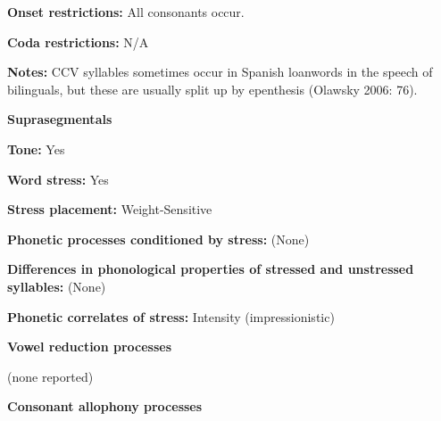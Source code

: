 \begin{styleBody}
\textbf{Onset restrictions: }All consonants occur.
\end{styleBody}

\begin{styleBody}
\textbf{Coda restrictions: }N/A
\end{styleBody}

\begin{styleBody}
\textbf{Notes: }CCV syllables sometimes occur in Spanish loanwords in the speech of bilinguals, but these are usually split up by epenthesis (Olawsky 2006: 76).
\end{styleBody}

\begin{styleBody}
\textbf{Suprasegmentals}
\end{styleBody}

\begin{styleBody}
\textbf{Tone:} Yes
\end{styleBody}

\begin{styleBody}
\textbf{Word stress: }Yes
\end{styleBody}

\begin{styleBody}
\textbf{Stress placement:} Weight-Sensitive
\end{styleBody}

\begin{styleBody}
\textbf{Phonetic processes conditioned by stress:} (None)
\end{styleBody}

\begin{styleBody}
\textbf{Differences in phonological properties of stressed and unstressed syllables:} (None)
\end{styleBody}

\begin{styleBody}
\textbf{Phonetic correlates of stress: }Intensity (impressionistic)
\end{styleBody}

\begin{styleBody}
\textbf{Vowel reduction processes}
\end{styleBody}

\begin{styleBody}
(none reported)
\end{styleBody}

\begin{styleBody}
\textbf{Consonant allophony processes}
\end{styleBody}

